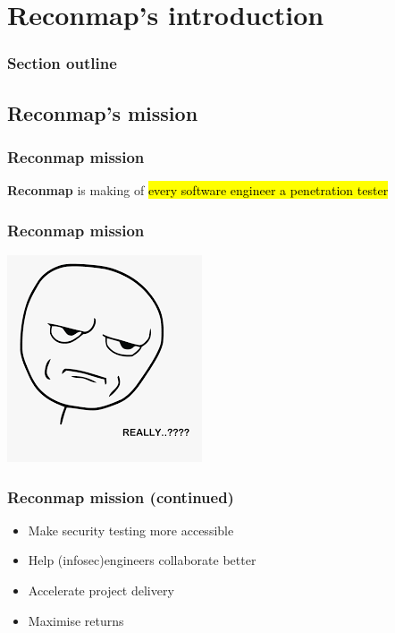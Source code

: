 \section{Reconmap's introduction}

\begin{frame}
    \frametitle{Section outline}

    \tableofcontents[currentsubsection, hideothersubsections, sectionstyle=show/hide]
\end{frame}

\subsection{Reconmap's mission}

\begin{frame}
    \frametitle{Reconmap mission}

    \note[item]{
    }
    
	\huge{\textbf{Reconmap} is making of \hl{every software engineer a penetration tester}}
\end{frame}

\begin{frame}
    \frametitle{Reconmap mission}

    \note[item]{
    }
    
    \centering
    \includegraphics[scale=0.6]{oh-really.png}
\end{frame}

\begin{frame}
    \frametitle{Reconmap mission (continued)}

    \note[item]{
    }
    
    \begin{itemize}
    \item Make security testing more accessible
	\item Help (infosec)engineers collaborate better
    \item Accelerate project delivery
    \item Maximise returns
    \end{itemize}
\end{frame}


